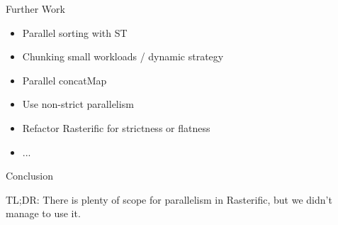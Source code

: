 \documentclass[slidestop,compress,mathserif, xcolor=table]{beamer}
\begin{document}
\begin{frame}[c]{Further Work}

\begin{itemize}
\item Parallel sorting with ST
\item Chunking small workloads / dynamic strategy
\item Parallel concatMap
\item Use non-strict parallelism
\item Refactor Rasterific for strictness or flatness
\item ...
\end{itemize}
\end{frame}

\begin{frame}[c]{Conclusion}

TL;DR: There is plenty of scope for parallelism in Rasterific, but we didn't manage to use it.

\end{frame}
\end{document}
